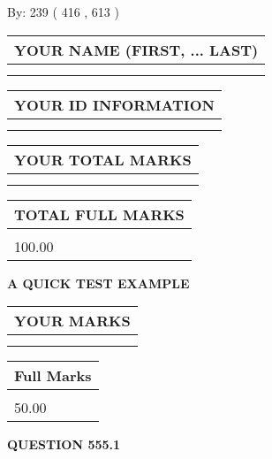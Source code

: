\documentclass[12pt]{article}
\begin{document}
   
\hspace{1.0in} By: 
 239 ( 416 ,  613 )
   
   
   
   
\newpage 
\setcounter{page}{ 
   555001 } 
   
   
   
   
\noindent\begin{tabular}{|l|}
\hline
YOUR NAME (FIRST, ... LAST)  \\
\hline
 \\ 
 \\ 
\hline
\end{tabular}
\hspace{0.05in} \begin{tabular}{|l|}
\hline
 YOUR   ID   INFORMATION  \\
\hline
 \\ 
 \\ 
\hline
\end{tabular}
   
   
\vspace{0.2in}\noindent\begin{tabular}{|l|}
\hline
YOUR TOTAL MARKS  \\
\hline
 \\ 
 \\ 
\hline
\end{tabular}
\hspace{0.05in} \begin{tabular}{|l|}
\hline
TOTAL FULL MARKS  \\
\hline
 \\ 
100.00 \\
\hline
\end{tabular}
   
   
 \vspace{0.2in}
{\LARGE {\textbf{ A QUICK TEST EXAMPLE}}}
   
   
  
\vspace{0.2in}
  
\noindent\begin{tabular}{|l|}
\hline
 YOUR MARKS  \\
\hline
 \\ 
 \\ 
\hline
\end{tabular}
\hspace{0.05in} \begin{tabular}{|l|}
\hline
 Full Marks  \\
\hline
 \\ 
50.00 \\
\hline
\end{tabular}
{\textbf{\Large{QUESTION
555.1 
}}}
  
\end{document}
